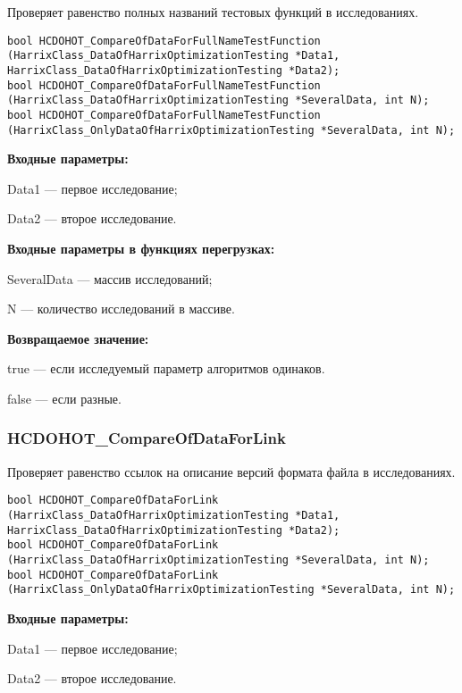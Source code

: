 \documentclass[a4paper,12pt]{article}
\begin{document}
Проверяет равенство полных названий тестовых функций в исследованиях.


\begin{lstlisting}[label=code_syntax_HCDOHOT_CompareOfDataForFullNameTestFunction,caption=Синтаксис]
bool HCDOHOT_CompareOfDataForFullNameTestFunction (HarrixClass_DataOfHarrixOptimizationTesting *Data1, HarrixClass_DataOfHarrixOptimizationTesting *Data2);
bool HCDOHOT_CompareOfDataForFullNameTestFunction (HarrixClass_DataOfHarrixOptimizationTesting *SeveralData, int N);
bool HCDOHOT_CompareOfDataForFullNameTestFunction (HarrixClass_OnlyDataOfHarrixOptimizationTesting *SeveralData, int N);
\end{lstlisting}

\textbf{Входные параметры:}

Data1 --- первое исследование;

Data2 --- второе исследование.

\textbf{Входные параметры в функциях перегрузках:}

SeveralData --- массив исследований;

N --- количество исследований в массиве.

\textbf{Возвращаемое значение:}

true --- если исследуемый параметр алгоритмов одинаков.

false --- если разные.


\subsubsection{HCDOHOT\_CompareOfDataForLink}\label{HCDOHOT_CompareOfDataForLink}

Проверяет равенство ссылок на описание версий формата файла в исследованиях.


\begin{lstlisting}[label=code_syntax_HCDOHOT_CompareOfDataForLink,caption=Синтаксис]
bool HCDOHOT_CompareOfDataForLink (HarrixClass_DataOfHarrixOptimizationTesting *Data1, HarrixClass_DataOfHarrixOptimizationTesting *Data2);
bool HCDOHOT_CompareOfDataForLink (HarrixClass_DataOfHarrixOptimizationTesting *SeveralData, int N);
bool HCDOHOT_CompareOfDataForLink (HarrixClass_OnlyDataOfHarrixOptimizationTesting *SeveralData, int N);
\end{lstlisting}

\textbf{Входные параметры:}

Data1 --- первое исследование;

Data2 --- второе исследование.
\end{document}
